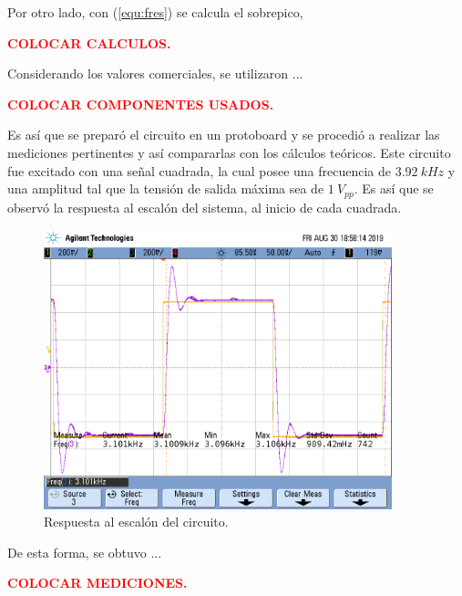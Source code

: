 \documentclass[11pt, a4paper]{article}
\begin{document}
Por otro lado, con (\ref{equ:fres}) se calcula el sobrepico,

\begin{center}
	\textcolor{red}{\textbf{COLOCAR CALCULOS.}}
\end{center}

Considerando los valores comerciales, se utilizaron ...

\begin{center}
	\textcolor{red}{\textbf{COLOCAR COMPONENTES USADOS.}}
\end{center}

Es así que se preparó el circuito en un protoboard y se procedió a realizar las mediciones pertinentes y así compararlas con los cálculos teóricos. Este circuito fue excitado con una señal cuadrada, la cual posee una frecuencia de $3.92 \ kHz$ y una amplitud tal que la tensión de salida máxima sea de $1 \ V_{pp}$. Es así que se observó la respuesta al escalón del sistema, al inicio de cada cuadrada.

\begin{figure}[H]
	\centering
	\includegraphics[width=0.9\textwidth, trim = {0 3.4cm 0.4cm 2cm},clip]{Ejercicio2/Mediciones/A/scope_0.png}
\caption{Respuesta al escalón del circuito.}
	\label{fig:rtaescalon}
\end{figure}

De esta forma, se obtuvo ...
\begin{center}
	\textcolor{red}{\textbf{COLOCAR MEDICIONES.}}
\end{center} 
\end{document}
